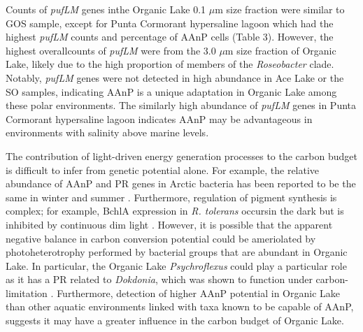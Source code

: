 Counts of \emph{pufLM} genes inthe Organic Lake 0.1 $\mu$m size fraction were similar to \ac{GOS} sample, except for Punta Cormorant hypersaline lagoon which had the highest \emph{pufLM} counts and percentage of \ac{AAnP} cells (Table 3). 
However, the highest overallcounts of \emph{pufLM} were from the 3.0 $\mu$m size fraction of Organic Lake, likely due to the high proportion of members of the \emph{Roseobacter} clade. 
Notably, \emph{pufLM} genes were not detected in high abundance in Ace Lake or the \ac{SO} samples, indicating \ac{AAnP} is a unique adaptation in Organic Lake among these polar environments. 
The similarly high abundance of \emph{pufLM} genes in Punta Cormorant hypersaline lagoon indicates \ac{AAnP} may be advantageous in environments with salinity above marine levels.

The contribution of light-driven energy generation processes to the carbon budget is difficult to infer from genetic potential alone. 
For example, the relative abundance of \ac{AAnP} and \ac{PR} genes in Arctic bacteria has been reported to be the same in winter and summer \cite{Cottrell2009}. 
Furthermore, regulation of pigment synthesis is complex; for example, \ac{BchlA} expression in \emph{R. tolerans} occursin the dark but is inhibited by continuous dim light \cite{Labrenz1999}. 
However, it is possible that the apparent negative balance in carbon conversion potential could be ameriolated by photoheterotrophy performed by bacterial groups that are abundant in Organic Lake. 
In particular, the Organic Lake \emph{Psychroflexus} could play a particular role as it has a \ac{PR} related to \emph{Dokdonia}, which was shown to function under carbon-limitation \cite{Gomez-Consarnau2007}.
Furthermore, detection of higher \ac{AAnP} potential in Organic Lake than other aquatic environments linked with taxa known to be capable of \ac{AAnP}, suggests it may have a greater influence in the carbon budget of Organic Lake.

